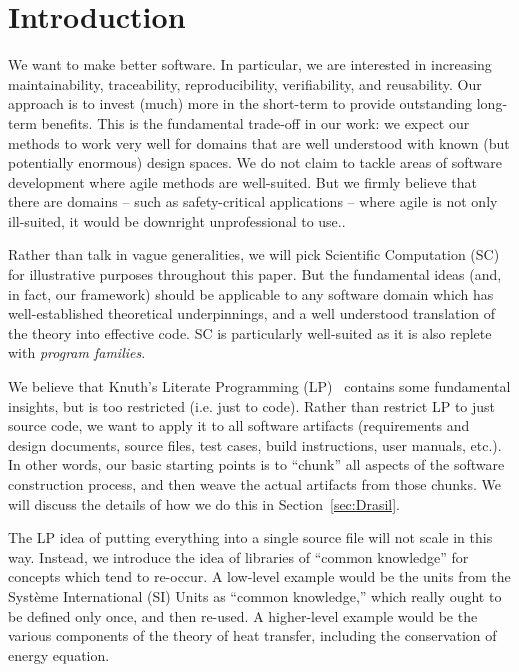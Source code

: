 \documentclass[preprint, 10pt]{sigplanconf}
\begin{document}
\section{Introduction}
\label{sec:Intro}

We want to make better software.  In particular, we are interested in
increasing maintainability, traceability, reproducibility, verifiability, and
reusability.  Our approach is to invest (much) more in the short-term to provide
outstanding long-term benefits. This is the fundamental trade-off in %
our work: we expect our methods to work very well for domains that are well
understood with known (but potentially enormous) design spaces.  We do not claim
to tackle areas of software development where agile methods are
well-suited.  But we firmly believe that there are domains -- such as
safety-critical applications -- where agile is not only ill-suited, it would be
downright unprofessional to use..

Rather than talk in vague generalities, we will pick Scientific Computation
(SC) for illustrative purposes throughout this paper.  But the fundamental
ideas (and, in fact, our framework) should be applicable to any software
domain which has well-established theoretical underpinnings, and a well
understood translation of the theory into effective code.  SC is particularly
well-suited as it is also replete with \emph{program families}.

We believe that Knuth's Literate Programming (LP)~\cite{Knuth1984} contains
some fundamental insights, but is too restricted (i.e. just to code).  Rather
than restrict LP to just source code, we want to apply it to all software
artifacts (requirements and design documents, source files, test cases, build
instructions, user manuals, etc.).  In other words, our basic starting points is
to ``chunk'' all aspects of the software construction process, and then weave the
actual artifacts from those chunks.  We will discuss the details of how we do this
in Section~\ref{sec:Drasil}.

The LP idea of putting everything into a single source file will not scale
in this way.  Instead, we introduce the idea of libraries of ``common knowledge''
for concepts which tend to re-occur.  A low-level example would be the units
from the Syst\`{e}me International (SI) Units as ``common knowledge,'' which really
ought to be defined only once, and then re-used.  A higher-level example would be
the various components of the theory of heat transfer, including the conservation
of energy equation.
\end{document}
